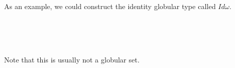 
As an example, we could construct the identity globular type called $Idω$.

\begin{code}\>\<%
\\
\> \<[7]%
\>[7]\AgdaSymbol{:} \AgdaSymbol{(} \AgdaSymbol{:} \AgdaSymbol{)}  \<%
\\
\>  \<[7]%
\>[7]\AgdaSymbol{=}         \AgdaSymbol{(}  \AgdaSymbol{))}\<%
\\
\>\<\end{code}

Note that this is usually not a globular set.


